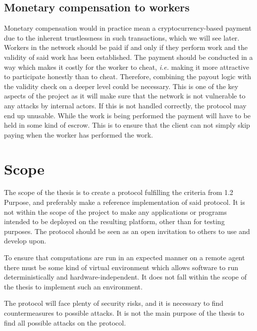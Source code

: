 \subsection{Monetary compensation to workers}
Monetary compensation would in practice mean a cryptocurrency-based payment due to the inherent trustlessness in such transactions, which we will see later. Workers in the network should be paid if and only if they perform work and the validity of said work has been established. The payment should be conducted in a way which makes it costly for the worker to cheat, \textit{i.e.} making it more attractive to participate honestly than to cheat. Therefore, combining the payout logic with the validity check on a deeper level could be necessary. This is one of the key aspects of the project as it will make sure that the network is not vulnerable to any attacks by internal actors. If this is not handled correctly, the protocol may end up unusable. While the work is being performed the payment will have to be held in some kind of escrow. This is to ensure that the client can not simply skip paying when the worker has performed the work. 

\section{Scope}
The scope of the thesis is to create a protocol fulfilling the criteria from 1.2 Purpose, and preferably make a reference implementation of said protocol. It is not within the scope of the project to make any applications or programs intended to be deployed on the resulting platform, other than for testing purposes. The protocol should be seen as an open invitation to others to use and develop upon.

To ensure that computations are run in an expected manner on a remote agent there must be some kind of virtual environment which allows software to run deterministically and hardware-independent. It does not fall within the scope of the thesis to implement such an environment.

The protocol will face plenty of security risks, and it is necessary to find countermeasures to possible attacks. It is not the main purpose of the thesis to find all possible attacks on the protocol.